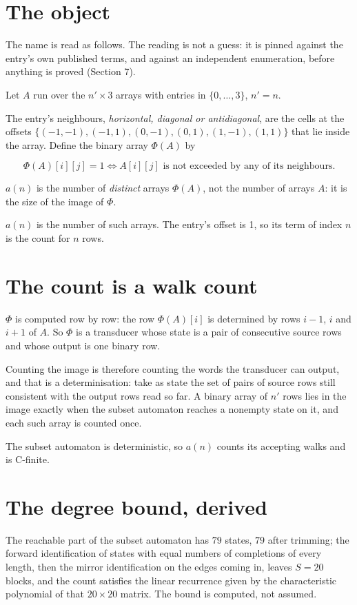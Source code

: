 \documentclass[11pt]{article}
\theoremstyle{definition}
\begin{document}
\section{The object}

The name is read as follows. The reading is not a guess: it is pinned against the entry's own published terms, and against an independent enumeration, before anything is proved (Section 7).

Let $A$ run over the $n' \times 3$ arrays with entries in $\{0,\dots,3\}$, $n' = n$.

The entry's neighbours, {\itshape horizontal, diagonal or antidiagonal}, are the cells at the offsets $\{(-1,-1), (-1,1), (0,-1), (0,1), (1,-1), (1,1)\}$ that lie inside the array. Define the binary array $\Phi(A)$ by

\[\Phi(A)[i][j] = 1 \iff A[i][j] \text{ is not exceeded by any of its neighbours}.\]

$a(n)$ is the number of {\itshape distinct} arrays $\Phi(A)$, not the number of arrays $A$: it is the size of the image of $\Phi$.

$a(n)$ is the number of such arrays. The entry's offset is 1, so its term of index $n$ is the count for $n$ rows.

\section{The count is a walk count}

$\Phi$ is computed row by row: the row $\Phi(A)[i]$ is determined by rows $i-1$, $i$ and $i+1$ of $A$. So $\Phi$ is a transducer whose state is a pair of consecutive source rows and whose output is one binary row.

Counting the image is therefore counting the words the transducer can output, and that is a determinisation: take as state the set of pairs of source rows still consistent with the output rows read so far. A binary array of $n'$ rows lies in the image exactly when the subset automaton reaches a nonempty state on it, and each such array is counted once.

The subset automaton is deterministic, so $a(n)$ counts its accepting walks and is C-finite.

\section{The degree bound, derived}

The reachable part of the subset automaton has $79$ states, $79$ after trimming; the forward identification of states with equal numbers of completions of every length, then the mirror identification on the edges coming in, leaves $S = 20$ blocks, and the count satisfies the linear recurrence given by the characteristic polynomial of that $20\times20$ matrix. The bound is computed, not assumed.
\end{document}
